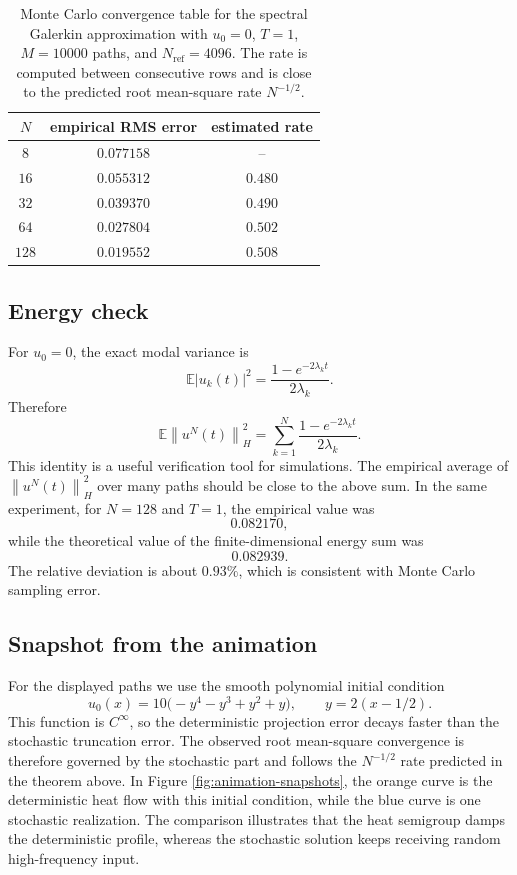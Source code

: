 \documentclass[11pt,a4paper]{article}
\newcommand{\E}{\mathbb{E}}
\newcommand{\norm}[1]{\left\lVert #1 \right\rVert}
\begin{document}
\begin{table}[h]
\centering
\begin{tabular}{ccc}
\toprule
\(N\) & empirical RMS error & estimated rate \\
\midrule
\(8\) & \(0.077158\) & -- \\
\(16\) & \(0.055312\) & \(0.480\) \\
\(32\) & \(0.039370\) & \(0.490\) \\
\(64\) & \(0.027804\) & \(0.502\) \\
\(128\) & \(0.019552\) & \(0.508\) \\
\bottomrule
\end{tabular}
\caption{Monte Carlo convergence table for the spectral Galerkin approximation
with \(u_0=0\), \(T=1\), \(M=10000\) paths, and \(N_{\mathrm{ref}}=4096\).
The rate is computed between consecutive rows and is close to the predicted
root mean-square rate \(N^{-1/2}\).}
\end{table}

\subsection{Energy check}

For \(u_0=0\), the exact modal variance is
\[
  \E|u_k(t)|^2
  =
  \frac{1-e^{-2\lambda_k t}}{2\lambda_k}.
\]
Therefore
\[
  \E\norm{u^N(t)}_H^2
  =
  \sum_{k=1}^{N}
  \frac{1-e^{-2\lambda_k t}}{2\lambda_k}.
\]
This identity is a useful verification tool for simulations. The empirical
average of \(\norm{u^N(t)}_H^2\) over many paths should be close to the above
sum. In the same experiment, for \(N=128\) and \(T=1\), the empirical value was
\[
  0.082170,
\]
while the theoretical value of the finite-dimensional energy sum was
\[
  0.082939.
\]
The relative deviation is about \(0.93\%\), which is consistent with Monte
Carlo sampling error.

\subsection{Snapshot from the animation}

For the displayed paths we use the smooth polynomial initial condition
\[
  u_0(x)=10\bigl(-y^4-y^3+y^2+y\bigr),
  \qquad y=2(x-1/2).
\]
This function is \(C^\infty\), so the deterministic projection error decays
faster than the stochastic truncation error. The observed root mean-square
convergence is therefore governed by the stochastic part and follows the
\(N^{-1/2}\) rate predicted in the theorem above. In Figure
\ref{fig:animation-snapshots}, the orange curve is the deterministic heat flow
with this initial condition, while the blue curve is one stochastic
realization. The comparison illustrates that the heat semigroup damps the
deterministic profile, whereas the stochastic solution keeps receiving random
high-frequency input.
\end{document}
